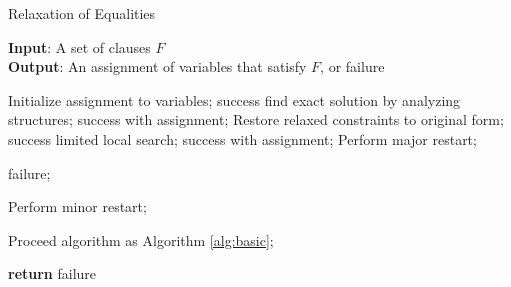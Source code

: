 \begin{algorithm}[t]
    \caption{Relaxation of Equalities}
    \label{alg:relaxation}
    \textbf{Input}: A set of clauses $F$ \\
    \textbf{Output}: An assignment of variables that satisfy $F$, or failure
    
    \begin{algorithmic}[1] %
        \Statex \hrulefill
        \STATE Initialize assignment to variables;
        \While {\top}
            \STATE success \leftarrow find exact solution by analyzing structures;
            \RETURN success with assignment;
            \ELSE
            \STATE Restore relaxed constraints to original form;
            \STATE success \leftarrow limited local search;
            \RETURN success with assignment;
            \ELSE
            \STATE Perform major restart;
            \ENDIF
            \ENDIF
            \ENDIF

            \RETURN failure;
            \ENDIF

            \STATE Perform minor restart;
            \ENDIF
            
            \STATE Proceed algorithm as Algorithm \ref{alg:basic};
        \EndWhile

        \STATE \textbf{return} failure
    \end{algorithmic}
\end{algorithm}